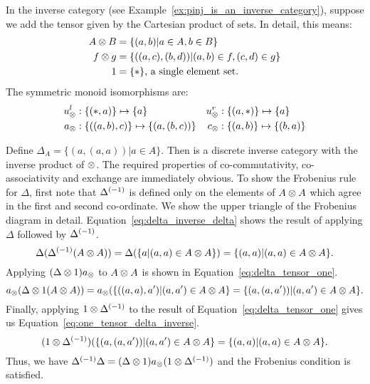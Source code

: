\begin{example}\label{ex:pinj_is_a_discrete_inverse_category}
  In the inverse category \pinj (see Example~\ref{ex:pinj_is_an_inverse_category}), suppose we add
  the tensor given by the Cartesian product of sets. In detail, this means:
  \begin{align*}
    A \otimes B &= \{(a,b)| a\in A, b\in B\}\\
    f \otimes g &= \{((a,c),(b,d)) | (a,b) \in f, (c,d) \in g\}\\
    1 & = \{*\}\text{, a single element set.}
  \end{align*}
  The symmetric monoid isomorphisms are:
    \begin{align*}
      u_{\otimes}^l &: \{(*,a)\} \mapsto \{a\}
      &u_{\otimes}^r &: \{(a,*)\} \mapsto \{a\}\\
      a_{\otimes} &: \{((a,b),c)\} \mapsto \{(a,(b,c))\}
      &c_{\otimes} &: \{(a,b)\} \mapsto \{(b,a)\}
    \end{align*}

  Define $\Delta_A = \{(a,(a,a)) | a\in A\}$. Then \pinj is a discrete inverse category with the
  inverse product of $\otimes$. The required properties of co-commutativity, co-associativity and
  exchange are immediately obvious. To show the Frobenius rule for $\Delta$, first note that
  ${\Delta}^{(-1)}$ is defined only on the elements of $A\otimes A$ which agree in the first and second
  co-ordinate. We show the upper triangle of the Frobenius diagram in
  detail. Equation~\ref{eq:delta_inverse_delta} shows the result of applying $\Delta$ followed by
  ${\Delta}^{(-1)}$.
  \begin{equation}
    \Delta({\Delta}^{(-1)}(A\otimes A)) = \Delta(\{a | (a,a) \in A\otimes A\})
    = \{(a,a) | (a,a) \in A\otimes A\}.\label{eq:delta_inverse_delta}
  \end{equation}
  Applying $(\Delta \otimes 1)a_{\otimes}$ to $A\otimes A$ is shown in Equation~\ref{eq:delta_tensor_one}.
  \begin{equation}
    a_{\otimes}(\Delta\otimes1(A\otimes A)) = a_{\otimes}(\{((a,a),a') | (a,a') \in A\otimes A\} = \{(a,(a,a')) | (a,a') \in
    A\otimes A\}.\label{eq:delta_tensor_one}
  \end{equation}
  Finally, applying $1 \otimes {\Delta}^{(-1)}$ to the result of Equation~\ref{eq:delta_tensor_one} gives us
  Equation~\ref{eq:one_tensor_delta_inverse}.
  \begin{equation}
    (1\otimes{\Delta}^{(-1)})(\{(a,(a,a')) | (a,a') \in  A\otimes A\} = \{(a,a) | (a,a) \in A\otimes A\} \label{eq:one_tensor_delta_inverse}.
  \end{equation}
  Thus, we have ${\Delta}^{(-1)}\Delta = (\Delta \otimes 1) a_{\otimes} (1\otimes{\Delta}^{(-1)})$ and the Frobenius
  condition is satisfied.
\end{example}


